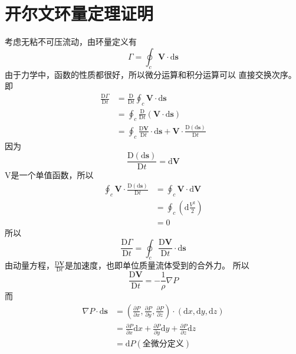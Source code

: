 
\chapter{开尔文环量定理证明}
\label{kelvin theroem}
考虑无粘不可压流动，由环量定义有
\[
	\Gamma=\oint _c \mathbf{V}\cdot \mathrm{d} \mathbf{s}
\]
由于力学中，函数的性质都很好，所以微分运算和积分运算可以
直接交换次序。即
\[
	\begin{split}
		\frac{\mathrm{D} \Gamma}{\mathrm{D}t } & =\frac{\mathrm{D} }{\mathrm{D} t }\oint _c \mathbf{V} \cdot \mathrm{d}\mathbf{s}  \\
		                                       & =\oint _c \frac{\mathrm{D}}{\mathrm{D} t}(\mathbf{V}\cdot \mathrm{d} \mathbf{s})  \\
		                                       & =\oint _c \frac{\mathrm{D} \mathbf{V} }{\mathrm{D} t}\cdot \mathrm{d}\mathbf{s} +
		\mathbf{V}\cdot \frac{\mathrm{D}(\mathrm{d}\mathbf{s})}{\mathrm{D} t}
	\end{split}
\]
因为
\[
	\frac{\mathrm{D}(\mathrm{d}\mathbf{s})}{\mathrm{D}t}=\mathrm{d}\mathbf{V}
\]
V是一个单值函数，所以
\[
	\begin{split}
		\oint _c \mathbf{V} \cdot \frac{\mathrm{D}(\mathrm{d}\mathbf{s})}{\mathrm{D}t} & =
		\oint _c \mathbf{V}\cdot \mathrm{d}\mathbf{V}                                       \\
		                                                                               & =
		\oint _c (\mathrm{d} \frac{V^2}{2})                                                 \\
		                                                                               & =0
	\end{split}
\]
所以
\[
	\frac{\mathrm{D} \Gamma}{\mathrm{D}t}=\oint _c \frac{\mathrm{D} \mathbf{V}}{\mathrm{D}t}\cdot \mathrm{d}\mathbf{s}
\]
由动量方程，$\frac{\mathrm{D}\mathbf{V}}{\mathrm{D}t}$是加速度，也即单位质量流体受到的合外力。
所以
\[
  \frac{\mathrm{D}\mathbf{V}}{\mathrm{D}t}=-\frac{1}{\rho}\nabla P
\]
而
\[
  \begin{split}
  \nabla P \cdot \mathrm{d}\mathbf{s}&=(\frac{\partial P }{\partial x},\frac{\partial P}{\partial y},
  \frac{\partial P}{\partial z})\cdot (\mathrm{d}x,\mathrm{d}y,\mathrm{d}z)\\ 
                                     &=\frac{\partial P }{\partial x}\mathrm{d}x+
                                     \frac{\partial P}{\partial y}\mathrm{d}y+
  \frac{\partial P}{\partial z}\mathrm{d}z\\
                                     &=\mathrm{d}P(全微分定义)
  \end{split}
\]
